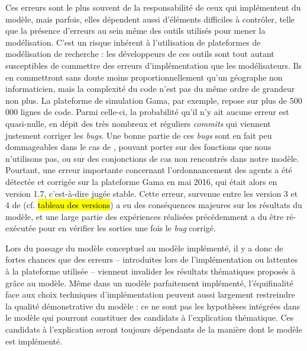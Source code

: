Ces erreurs sont le plus souvent de la responsabilité de ceux qui implémentent du modèle, mais parfois, elles dépendent aussi d'éléments difficiles à contrôler, telle que la présence d'erreurs au sein même des outils utilisés pour mener la modélisation.
C'est un risque inhérent à l'utilisation de plateformes de modélisation \og de recherche\fg{} : les développeurs de ces outils sont tout autant susceptibles de commettre des erreurs d'implémentation que les modélisateurs.
Ils en commettront sans doute moins proportionnellement qu'un géographe non informaticien, mais la complexité du code n'est pas du même ordre de grandeur non plus.
La plateforme de simulation Gama, par exemple, repose sur plus de 500 000 lignes de code.
Parmi celle-ci, la probabilité qu'il n'y ait aucune erreur est quasi-nulle, en dépit des très nombreux et réguliers \textit{commits} qui viennent justement corriger les \textit{bugs}.
Une bonne partie de ces \textit{bugs} sont en fait peu dommageables dans le cas de \simfeodal{}, pouvant porter sur des fonctions que nous n'utilisons pas, ou sur des conjonctions de cas non rencontrés dans notre modèle.
Pourtant, une erreur importante concernant l'ordonnancement des agents a été détectée et corrigée sur la plateforme Gama en mai 2016, qui était alors en version 1.7, c'est-à-dire jugée stable.
Cette erreur, survenue entre les version 3 et 4 de \simfeodal{} (cf. \hl{tableau des versions}) a eu des conséquences majeures sur les résultats du modèle, et une large partie des expériences réalisées précédemment a du être ré-exécutée pour en vérifier les sorties une fois le \textit{bug} corrigé.

Lors du passage du modèle conceptuel au modèle implémenté, il y a donc de fortes chances que des erreurs -- introduites lors de l'implémentation ou lattentes à la plateforme utilisée -- viennent invalider les résultats thématiques proposés à grâce au modèle.
Même dans un modèle parfaitement implémenté, l'équifinalité face aux choix techniques d'implémentation peuvent aussi largement restreindre la qualité démonstrative du modèle : ce ne sont pas les hypothèses intégrées dans le modèle qui pourront constituer des candidats à l'explication thématique.
Ces candidats à l'explication seront toujours dépendants de la manière dont le modèle est implémenté.

